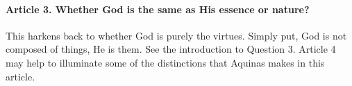 \documentclass{ucetd}
\begin{document}
\paragraph{Article 3. Whether God is the same as His essence or nature?}
This harkens back to whether God is purely the virtues. Simply put, God is not composed of things, He is them. See the introduction to Question 3. Article 4 may help to illuminate some of the distinctions that Aquinas makes in this article.
\end{document}
